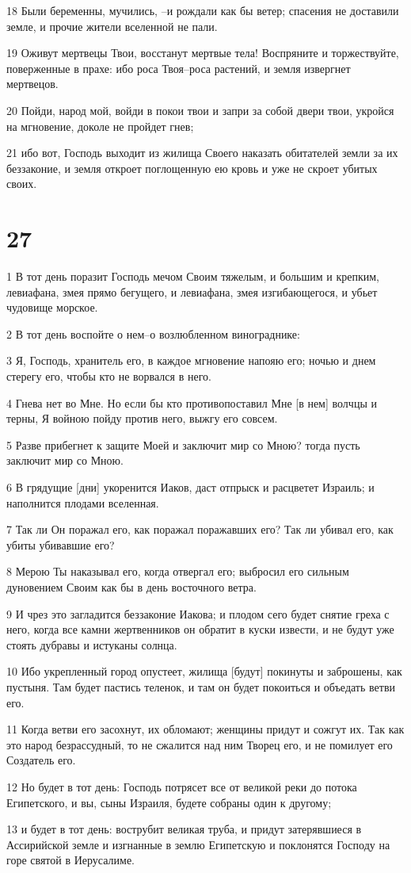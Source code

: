 \par 18 Были беременны, мучились, --и рождали как бы ветер; спасения не доставили земле, и прочие жители вселенной не пали.
\par 19 Оживут мертвецы Твои, восстанут мертвые тела! Воспряните и торжествуйте, поверженные в прахе: ибо роса Твоя--роса растений, и земля извергнет мертвецов.
\par 20 Пойди, народ мой, войди в покои твои и запри за собой двери твои, укройся на мгновение, доколе не пройдет гнев;
\par 21 ибо вот, Господь выходит из жилища Своего наказать обитателей земли за их беззаконие, и земля откроет поглощенную ею кровь и уже не скроет убитых своих.

\chapter{27}

\par 1 В тот день поразит Господь мечом Своим тяжелым, и большим и крепким, левиафана, змея прямо бегущего, и левиафана, змея изгибающегося, и убьет чудовище морское.
\par 2 В тот день воспойте о нем--о возлюбленном винограднике:
\par 3 Я, Господь, хранитель его, в каждое мгновение напояю его; ночью и днем стерегу его, чтобы кто не ворвался в него.
\par 4 Гнева нет во Мне. Но если бы кто противопоставил Мне [в нем] волчцы и терны, Я войною пойду против него, выжгу его совсем.
\par 5 Разве прибегнет к защите Моей и заключит мир со Мною? тогда пусть заключит мир со Мною.
\par 6 В грядущие [дни] укоренится Иаков, даст отпрыск и расцветет Израиль; и наполнится плодами вселенная.
\par 7 Так ли Он поражал его, как поражал поражавших его? Так ли убивал его, как убиты убивавшие его?
\par 8 Мерою Ты наказывал его, когда отвергал его; выбросил его сильным дуновением Своим как бы в день восточного ветра.
\par 9 И чрез это загладится беззаконие Иакова; и плодом сего будет снятие греха с него, когда все камни жертвенников он обратит в куски извести, и не будут уже стоять дубравы и истуканы солнца.
\par 10 Ибо укрепленный город опустеет, жилища [будут] покинуты и заброшены, как пустыня. Там будет пастись теленок, и там он будет покоиться и объедать ветви его.
\par 11 Когда ветви его засохнут, их обломают; женщины придут и сожгут их. Так как это народ безрассудный, то не сжалится над ним Творец его, и не помилует его Создатель его.
\par 12 Но будет в тот день: Господь потрясет все от великой реки до потока Египетского, и вы, сыны Израиля, будете собраны один к другому;
\par 13 и будет в тот день: вострубит великая труба, и придут затерявшиеся в Ассирийской земле и изгнанные в землю Египетскую и поклонятся Господу на горе святой в Иерусалиме.

